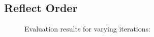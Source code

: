 \subsection{Reflect Order}


%	       
%	       

\begin{figure}[H]
    \setlength\figureheight{7cm}
    \small
    \setlength\figurewidth{\textwidth}
	\centering
	\begin{tikzpicture}
	    \footnotesize
	    
	    
	\end{tikzpicture}
	
	\caption[Evaluation results for varying  iterations]{Evaluation results for varying  iterations: }
	\label{fig:trial1}
\end{figure}